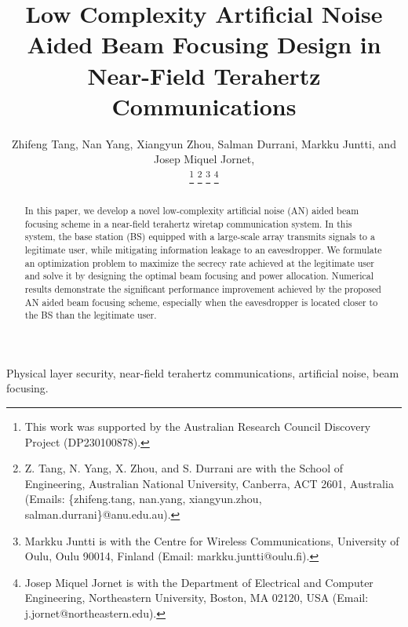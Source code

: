 \documentclass[10pt,technote]{IEEEtran}
\newcommand{\1}{\mathbbm{1}}
\begin{document}
\title{Low Complexity Artificial Noise Aided Beam Focusing Design in Near-Field Terahertz Communications}

\author{Zhifeng Tang,  Nan Yang,  Xiangyun Zhou,  Salman Durrani,  Markku Juntti,  and Josep Miquel Jornet, 


\thanks{This work was supported by the Australian Research Council Discovery Project (DP230100878).}
\thanks{Z. Tang, N. Yang, X. Zhou, and S. Durrani are with the School of Engineering, Australian National University, Canberra, ACT 2601, Australia (Emails: \{zhifeng.tang, nan.yang, xiangyun.zhou, salman.durrani\}@anu.edu.au).}
\thanks{Markku Juntti is with the Centre for Wireless Communications, University of Oulu, Oulu 90014, Finland (Email: markku.juntti@oulu.fi).}
\thanks{Josep Miquel Jornet is with the Department of Electrical and Computer Engineering, Northeastern University, Boston, MA 02120, USA (Email: j.jornet@northeastern.edu).}}

\maketitle

\begin{abstract}
In this paper, we develop a novel low-complexity artificial noise (AN) aided beam focusing scheme in a near-field terahertz wiretap communication system. In this system, the base station (BS) equipped with a large-scale array transmits signals to a legitimate user, while mitigating information leakage to an eavesdropper. We formulate an optimization problem to maximize the secrecy rate achieved at the legitimate user and solve it by designing the optimal beam focusing and power allocation. %
Numerical results demonstrate the significant performance improvement achieved by the proposed AN aided beam focusing scheme, especially when the eavesdropper is located closer to the BS than the legitimate user.
\end{abstract}

\begin{IEEEkeywords}
Physical layer security, near-field terahertz communications, artificial noise, beam focusing.
\end{IEEEkeywords}
\end{document}
